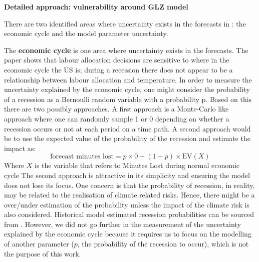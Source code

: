 \documentclass[a4paper,11pt]{extarticle} %
\theoremstyle{definition}
\begin{document}
\textbf{Detailed approach: vulnerability around GLZ model}

There are two identified areas where uncertainty exists in the forecasts in \cite{NeidellEtAl:2021}: the economic cycle and the model parameter uncertainty.

The \textbf{economic cycle} is one area where uncertainty exists in the forecasts.
The paper shows that labour allocation decisions are sensitive to where in the economic cycle the US is; during a recession there does not appear to be a relationship between labour allocation and temperature. In order to measure the uncertainty explained by the economic cycle, one might consider the probability of a recession as a Bernoulli random variable with a probability p. Based on this there are two possibly approaches. A first approach is a Monte-Carlo like approach where one can randomly sample 1 or 0 depending on whether a recession occurs or not at each period on a time path. A second approach would be to use the expected value of the probability of the recession and estimate the impact as:
\begin{equation}
    \label{Eq:economiccycle}
        \text{forecast minutes lost} = p \times 0 + (1-p) \times \text{EV}\left(X\right)
\end{equation}
Where $X$ is the variable that refers to Minutes Lost during normal economic cycle
The second approach is attractive in its simplicity and ensuring the model does not lose its focus.
One concern is that the probability of recession, in reality, may be related to the realisation of climate related risks. Hence, there might be a over/under estimation of the probability unless the impact of the climate risk is also considered. Historical model estimated recession probabilities can be sourced from \cite{ChauvetEtAl:2024}. However, we did not go further in the measurement of the uncertainty explained by the economic cycle because it requires us to focus on the modelling of another parameter ($p$, the probability of the recession to occur), which is not the purpose of this work.
\end{document}
